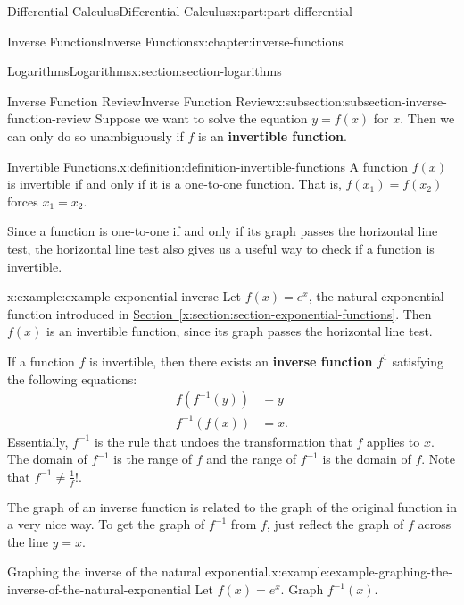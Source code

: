 \documentclass[twoside,10pt,]{tufte-book}
\newcommand{\xreffont}{\relax}
\newcommand{\terminology}[1]{\textbf{#1}}
\numberwithin{equation}{part}
\begin{document}
\begin{partptx}{Differential Calculus}{}{Differential Calculus}{}{}{x:part:part-differential}
\begin{chapterptx}{Inverse Functions}{}{Inverse Functions}{}{}{x:chapter:inverse-functions}
%
\begin{sectionptx}{Logarithms}{}{Logarithms}{}{}{x:section:section-logarithms}
%
%
\typeout{************************************************}
\typeout{************************************************}
%
\begin{subsectionptx}{Inverse Function Review}{}{Inverse Function Review}{}{}{x:subsection:subsection-inverse-function-review}
Suppose we want to solve the equation \(y = f(x)\) for \(x\). Then we can only do so unambiguously if \(f\) is an \terminology{invertible function}.%
\begin{definition}{Invertible Functions.}{x:definition:definition-invertible-functions}%
%
A function \(f(x)\) is invertible if and only if it is a one-to-one function. That is, \(f(x_{1}) = f(x_{2})\) forces \(x_{1} = x_{2}\).%
\end{definition}
Since a function is one-to-one if and only if its graph passes the horizontal line test, the horizontal line test also gives us a useful way to check if a function is invertible.%
\begin{example}{}{x:example:example-exponential-inverse}%
Let \(f(x) = e^{x}\), the natural exponential function introduced in \hyperref[x:section:section-exponential-functions]{Section~{\xreffont\ref{x:section:section-exponential-functions}}}. Then \(f(x)\) is an invertible function, since its graph passes the horizontal line test.%
\end{example}
If a function \(f\) is invertible, then there exists an \terminology{inverse function} \(f^{1}\) satisfying the following equations:%
\begin{align*}
f(f^{-1}(y)) & = y \\
f^{-1}(f(x)) & = x. 
\end{align*}
Essentially, \(f^{-1}\) is the rule that undoes the transformation that \(f\) applies to \(x\). The domain of \(f^{-1}\) is the range of \(f\) and the range of \(f^{-1}\) is the domain of \(f\). Note that \(f^{-1}\neq\frac{1}{f}\)!.%
\par
The graph of an inverse function is related to the graph of the original function in a very nice way. To get the graph of \(f^{-1}\) from \(f\), just reflect the graph of \(f\) across the line \(y=x\).%
\begin{example}{Graphing the inverse of the natural exponential.}{x:example:example-graphing-the-inverse-of-the-natural-exponential}%
Let \(f(x) = e^{x}\). Graph \(f^{-1}(x)\).%

\end{example}
\end{subsectionptx}
\end{sectionptx}
\end{chapterptx}
\end{partptx}
\end{document}
